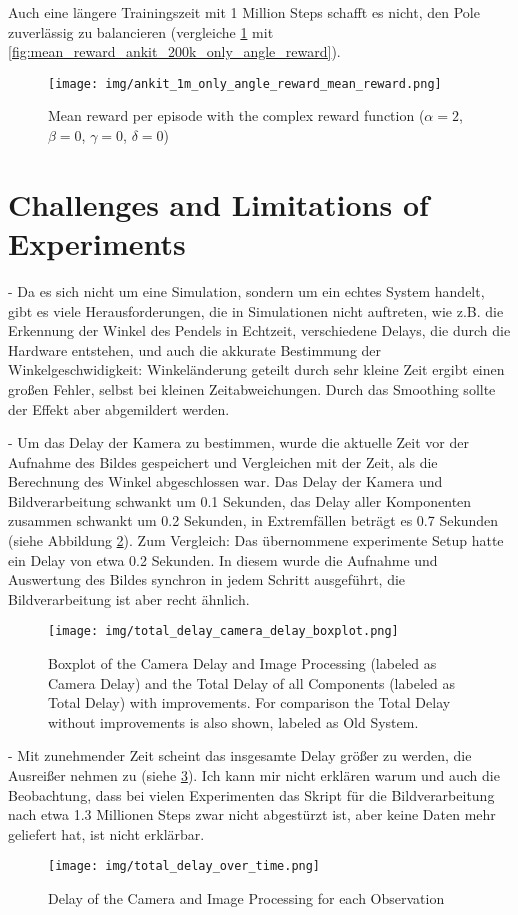 Auch eine längere Trainingszeit mit 1 Million Steps schafft es nicht, den Pole zuverlässig zu balancieren (vergleiche \ref{fig:mean_reward_ankit_1m_only_angle_reward} mit \ref{fig:mean_reward_ankit_200k_only_angle_reward}).
\begin{figure}[htbp]
    \centering
    \texttt{[image: img/ankit\_1m\_only\_angle\_reward\_mean\_reward.png]}
    \caption{Mean reward per episode with the complex reward function ($\alpha=2$, $\beta=0$, $\gamma=0$, $\delta=0$)}
    \label{fig:mean_reward_ankit_1m_only_angle_reward}
\end{figure}

\section{Challenges and Limitations of Experiments}
- Da es sich nicht um eine Simulation, sondern um ein echtes System handelt, gibt es viele Herausforderungen, die in Simulationen nicht auftreten, wie z.B. die Erkennung der Winkel des Pendels in Echtzeit, verschiedene Delays, die durch die Hardware entstehen, und auch die akkurate Bestimmung der Winkelgeschwidigkeit: Winkeländerung geteilt durch sehr kleine Zeit ergibt einen großen Fehler, selbst bei kleinen Zeitabweichungen. Durch das Smoothing sollte der Effekt aber abgemildert werden.

- Um das Delay der Kamera zu bestimmen, wurde die aktuelle Zeit vor der Aufnahme des Bildes gespeichert und Vergleichen mit der Zeit, als die Berechnung des Winkel abgeschlossen war. Das Delay der Kamera und Bildverarbeitung schwankt um 0.1 Sekunden, das Delay aller Komponenten zusammen schwankt um 0.2 Sekunden, in Extremfällen beträgt es 0.7 Sekunden (siehe Abbildung \ref{fig:camera_delay_boxplot}). Zum Vergleich: Das übernommene experimente Setup hatte ein Delay von etwa 0.2 Sekunden. In diesem wurde die Aufnahme und Auswertung des Bildes synchron in jedem Schritt ausgeführt, die Bildverarbeitung ist aber recht ähnlich.
\begin{figure}
    \centering
    \texttt{[image: img/total\_delay\_camera\_delay\_boxplot.png]}
    \caption{Boxplot of the Camera Delay and Image Processing (labeled as Camera Delay) and the Total Delay of all Components (labeled as Total Delay) with improvements. For comparison the Total Delay without improvements is also shown, labeled as Old System.}
    \label{fig:camera_delay_boxplot}
\end{figure}
- Mit zunehmender Zeit scheint das insgesamte Delay größer zu werden, die Ausreißer nehmen zu (siehe \ref{fig:total_delay_over_time}). Ich kann mir nicht erklären warum und auch die Beobachtung, dass bei vielen Experimenten das Skript für die Bildverarbeitung nach etwa 1.3 Millionen Steps zwar nicht abgestürzt ist, aber keine Daten mehr geliefert hat, ist nicht erklärbar.
\begin{figure}
    \centering
    \texttt{[image: img/total\_delay\_over\_time.png]}
    \caption{Delay of the Camera and Image Processing for each Observation}
    \label{fig:total_delay_over_time}
\end{figure}